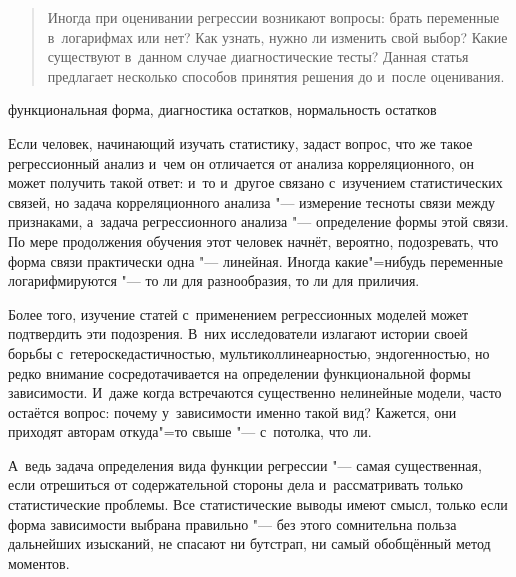 \documentclass[11pt]{article}
\begin{document}
\setcounter{page}{15}

		
		
\DoFirstPageTechnicalStuff
		
\begin{abstract}
Иногда при оценивании регрессии возникают вопросы: брать переменные в~логарифмах или нет? Как узнать, нужно ли изменить свой выбор? Какие существуют в~данном случае диагностические тесты? Данная статья предлагает несколько способов принятия решения до и~после оценивания.
\end{abstract}
		
\begin{keyword}
функциональная форма, диагностика остатков, нормальность остатков
\end{keyword}


Если человек, начинающий изучать статистику, задаст вопрос, что же такое регрессионный анализ и~чем он отличается от анализа корреляционного, он может получить такой ответ: и~то и~другое связано с~изучением статистических связей, но задача корреляционного анализа "--- измерение тесноты связи между признаками, а~задача регрессионного анализа "--- определение формы этой связи. По мере продолжения обучения этот человек начнёт, вероятно, подозревать, что форма связи практически одна "--- линейная. Иногда какие"=нибудь переменные логарифмируются "--- то ли для разнообразия, то ли для приличия.

Более того, изучение статей с~применением регрессионных моделей может подтвердить эти подозрения. В~них исследователи излагают истории своей борьбы с~гетероскедастичностью, мультиколлинеарностью, эндогенностью, но редко внимание сосредотачивается на определении функциональной формы зависимости. И~даже когда встречаются существенно нелинейные модели, часто остаётся вопрос: почему у~зависимости именно такой вид? Кажется, они приходят авторам откуда"=то свыше "--- с~потолка, что ли.

А~ведь задача определения вида функции регрессии "--- самая существенная, если отрешиться от содержательной стороны дела и~рассматривать только статистические проблемы. Все статистические выводы имеют смысл, только если форма зависимости выбрана правильно "--- без этого сомнительна польза дальнейших изысканий, не спасают ни бутстрап, ни самый обобщённый метод моментов.
\end{document}
